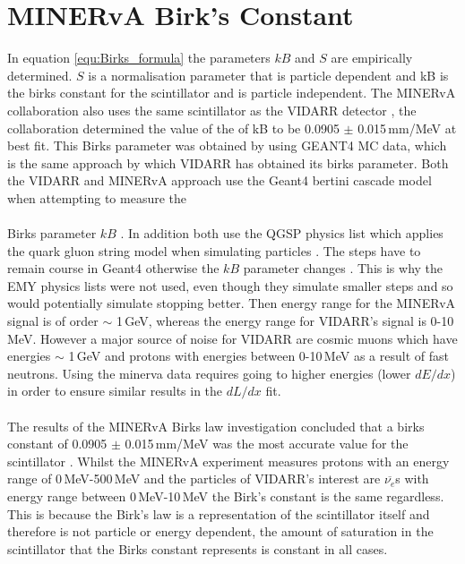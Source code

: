 \section{MINERvA Birk's Constant}\label{sec:geant4Simulation_MINERvABirksConstant}
In equation \ref{equ:Birks_formula} the parameters $kB$ and $S$ are empirically determined. $S$ is a normalisation parameter that is particle dependent and kB is the birks constant for the scintillator and is particle independent. The MINERvA collaboration \cite{aliaga_2015} also uses the same scintillator as the VIDARR detector \cite{aliaga_2014}, the collaboration determined the value of the of kB to be 0.0905 $\pm$ 0.015\,mm/MeV at best fit. This Birks parameter was obtained by using GEANT4 MC data, which is the same approach by which VIDARR has obtained its birks parameter.
Both the VIDARR and MINERvA approach use the Geant4 bertini cascade model when attempting to measure the \\\\Birks parameter $kB$ \cite{Heikkinen_2003}. In addition both use the QGSP physics list which applies the quark gluon string model when simulating particles \cite{Patrick_2018}. The steps have to remain course in Geant4 otherwise the $kB$ parameter changes  \cite{aliaga_2015}. This is why the EMY physics lists were not used, even though they simulate smaller steps and so would potentially simulate stopping better. Then energy range for the MINERvA signal is of order $\sim$ 1\,GeV, whereas the energy range for VIDARR's signal is 0-10\,MeV. However a major source of noise for VIDARR are cosmic muons which have energies $\sim$ 1\,GeV and protons with energies between 0-10\,MeV as a result of fast neutrons. Using the minerva data requires going to higher energies (lower $dE/dx$) in order to ensure similar results in the $dL/dx$ fit.  
\\\\The results of the MINERvA Birks law investigation concluded that a birks constant of 0.0905 $\pm$ 0.015\,mm/MeV was the most accurate value for the scintillator \cite{aliaga_2015}. Whilst the MINERvA experiment measures protons with an energy range of 0\,MeV-500\,MeV and the particles of VIDARR's interest are $\overline{\nu_{e}}$s with energy range between 0\,MeV-10\,MeV the Birk's constant is the same regardless. This is because the Birk's law is a representation of the scintillator itself and therefore is not particle or energy dependent, the amount of saturation in the scintillator that the Birks constant represents is constant in all cases. 

